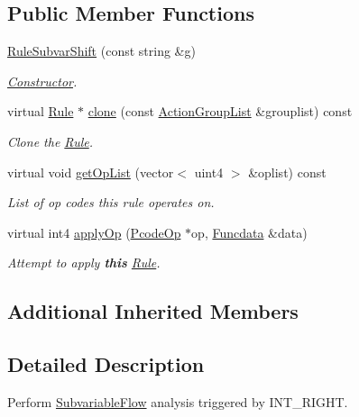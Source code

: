 \subsection*{Public Member Functions}
\begin{DoxyCompactItemize}
\item 
\mbox{\hyperlink{class_rule_subvar_shift_adf79aa6e94a9a651b4851c4def77b340}{Rule\+Subvar\+Shift}} (const string \&g)
\begin{DoxyCompactList}\small\item\em \mbox{\hyperlink{class_constructor}{Constructor}}. \end{DoxyCompactList}\item 
virtual \mbox{\hyperlink{class_rule}{Rule}} $\ast$ \mbox{\hyperlink{class_rule_subvar_shift_ad278c6c03817d7e98c0b7cb06b49bd53}{clone}} (const \mbox{\hyperlink{class_action_group_list}{Action\+Group\+List}} \&grouplist) const
\begin{DoxyCompactList}\small\item\em Clone the \mbox{\hyperlink{class_rule}{Rule}}. \end{DoxyCompactList}\item 
virtual void \mbox{\hyperlink{class_rule_subvar_shift_aadc6bfd270eec1e36456a22308231f84}{get\+Op\+List}} (vector$<$ uint4 $>$ \&oplist) const
\begin{DoxyCompactList}\small\item\em List of op codes this rule operates on. \end{DoxyCompactList}\item 
virtual int4 \mbox{\hyperlink{class_rule_subvar_shift_abfeba5a6e02b0d29a5cf98f34d3c3220}{apply\+Op}} (\mbox{\hyperlink{class_pcode_op}{Pcode\+Op}} $\ast$op, \mbox{\hyperlink{class_funcdata}{Funcdata}} \&data)
\begin{DoxyCompactList}\small\item\em Attempt to apply {\bfseries{this}} \mbox{\hyperlink{class_rule}{Rule}}. \end{DoxyCompactList}\end{DoxyCompactItemize}
\subsection*{Additional Inherited Members}


\subsection{Detailed Description}
Perform \mbox{\hyperlink{class_subvariable_flow}{Subvariable\+Flow}} analysis triggered by I\+N\+T\+\_\+\+R\+I\+G\+HT. 

